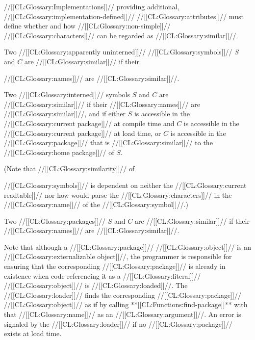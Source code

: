 //[[CL:Glossary:Implementations]]// providing additional, //[[CL:Glossary:implementation-defined]]// 
//[[CL:Glossary:attributes]]// must define whether and how //[[CL:Glossary:non-simple]]// //[[CL:Glossary:characters]]// 
can be regarded as //[[CL:Glossary:similar]]//.


Two //[[CL:Glossary:apparently uninterned]]// //[[CL:Glossary:symbols]]// $S$ and $C$ are //[[CL:Glossary:similar]]//
if their


//[[CL:Glossary:names]]//
are //[[CL:Glossary:similar]]//.

Two //[[CL:Glossary:interned]]// symbols $S$ and $C$ are //[[CL:Glossary:similar]]// 
if their //[[CL:Glossary:names]]// are //[[CL:Glossary:similar]]//,
and if either $S$ is accessible in the //[[CL:Glossary:current package]]// at compile time
          and $C$ is accessible in the //[[CL:Glossary:current package]]// at load time,
       or $C$ is accessible in the //[[CL:Glossary:package]]// that is //[[CL:Glossary:similar]]// to
          the //[[CL:Glossary:home package]]// of $S$.

(Note that //[[CL:Glossary:similarity]]// of


//[[CL:Glossary:symbols]]// is dependent
on neither the //[[CL:Glossary:current readtable]]// nor how  would
parse the //[[CL:Glossary:characters]]// in the //[[CL:Glossary:name]]// of the //[[CL:Glossary:symbol]]//.)



Two //[[CL:Glossary:packages]]// $S$ and $C$ are //[[CL:Glossary:similar]]// if their //[[CL:Glossary:names]]// are //[[CL:Glossary:similar]]//.

Note that although a //[[CL:Glossary:package]]// //[[CL:Glossary:object]]// is an //[[CL:Glossary:externalizable object]]//,
the programmer is responsible for ensuring that the corresponding //[[CL:Glossary:package]]// is
already in existence when code referencing it as a //[[CL:Glossary:literal]]// //[[CL:Glossary:object]]// 
is //[[CL:Glossary:loaded]]//.  The //[[CL:Glossary:loader]]// finds the corresponding //[[CL:Glossary:package]]// //[[CL:Glossary:object]]//
as if by calling **[[CL:Functions:find-package]]** with that //[[CL:Glossary:name]]// as an //[[CL:Glossary:argument]]//.
An error is signaled by the //[[CL:Glossary:loader]]// if no //[[CL:Glossary:package]]// exists at load time.


